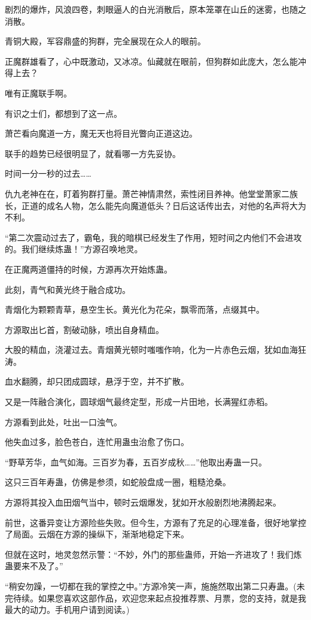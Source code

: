 \begin{this_body}
剧烈的爆炸，风浪四卷，刺眼逼人的白光消散后，原本笼罩在山丘的迷雾，也随之消散。

青铜大殿，军容鼎盛的狗群，完全展现在众人的眼前。

正魔群雄看了，心中既激动，又冰凉。仙藏就在眼前，但狗群如此庞大，怎么能冲得上去？

唯有正魔联手啊。

有识之士们，都想到了这一点。

萧芒看向魔道一方，魔无天也将目光瞥向正道这边。

联手的趋势已经很明显了，就看哪一方先妥协。

时间一分一秒的过去……

仇九老神在在，盯着狗群打量。萧芒神情肃然，索性闭目养神。他堂堂萧家二族长，正道的成名人物，怎么能先向魔道低头？日后这话传出去，对他的名声将大为不利。

“第二次震动过去了，霸龟，我的暗棋已经发生了作用，短时间之内他们不会进攻的。我们继续炼蛊！”方源召唤地灵。

在正魔两道僵持的时候，方源再次开始炼蛊。

此刻，青气和黄光终于融合成功。

青烟化为颗颗青草，悬空生长。黄光化为花朵，飘零而落，点缀其中。

方源取出匕首，割破动脉，喷出自身精血。

大股的精血，浇灌过去。青烟黄光顿时嗤嗤作响，化为一片赤色云烟，犹如血海狂涛。

血水翻腾，却只团成圆球，悬浮于空，并不扩散。

又是一阵融合演化，圆球烟气最终定型，形成一片田地，长满猩红赤稻。

方源看到此处，吐出一口浊气。

他失血过多，脸色苍白，连忙用蛊虫治愈了伤口。

“野草芳华，血气如海。三百岁为春，五百岁成秋……”他取出寿蛊一只。

这只三百年寿蛊，仿佛是参须，如蛇般盘成一圈，粗糙沧桑。

方源将其投入血田烟气当中，顿时云烟爆发，犹如开水般剧烈地沸腾起来。

前世，这番异变让方源险些失败。但今生，方源有了充足的心理准备，很好地掌控了局面。云烟在方源的操纵下，渐渐地稳定下来。

但就在这时，地灵忽然示警：“不妙，外门的那些蛊师，开始一齐进攻了！我们炼蛊要来不及了。”

“稍安勿躁，一切都在我的掌控之中。”方源冷笑一声，施施然取出第二只寿蛊。(未完待续。如果您喜欢这部作品，欢迎您来起点投推荐票、月票，您的支持，就是我最大的动力。手机用户请到阅读。)

\end{this_body}


